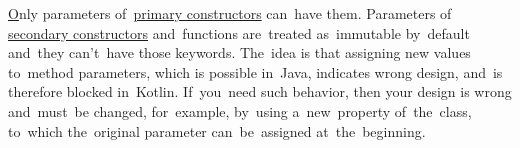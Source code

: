 \hyperref[kotlinvalvar]
Only parameters of~\hyperref[kotlinprimaryconstructor]{primary constructors} can~have them.
Parameters of \hyperref[kotlinsecondaryconstructor]{secondary constructors} and~functions are~treated as~immutable
by~default and~they can't~have those keywords.
The~idea is that assigning new values to~method parameters, which is possible in~Java, indicates wrong design, and~is therefore blocked in~Kotlin.
If~you~need such behavior, then your design is wrong and~must~be changed, for~example, by~using a~new~property of~the~class, to~which the~original parameter can~be~assigned at~the~beginning.
